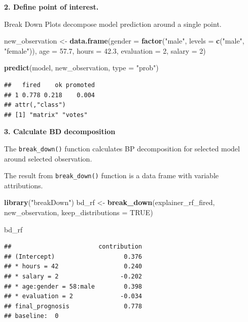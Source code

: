 \documentclass[]{book}
\newenvironment{Shaded}{\begin{snugshade}}{\end{snugshade}}
\newcommand{\DataTypeTok}[1]{\textcolor[rgb]{0.13,0.29,0.53}{#1}}
\newcommand{\DecValTok}[1]{\textcolor[rgb]{0.00,0.00,0.81}{#1}}
\newcommand{\FloatTok}[1]{\textcolor[rgb]{0.00,0.00,0.81}{#1}}
\newcommand{\KeywordTok}[1]{\textcolor[rgb]{0.13,0.29,0.53}{\textbf{#1}}}
\newcommand{\NormalTok}[1]{#1}
\newcommand{\OtherTok}[1]{\textcolor[rgb]{0.56,0.35,0.01}{#1}}
\newcommand{\StringTok}[1]{\textcolor[rgb]{0.31,0.60,0.02}{#1}}
\theoremstyle{definition}
\theoremstyle{definition}
\theoremstyle{definition}
\theoremstyle{remark}
\begin{document}
\textbf{2. Define point of interest.}

Break Down Plots decompose model prediction around a single point.

\begin{Shaded}
\begin{Highlighting}[]
\NormalTok{new_observation <-}\StringTok{ }\KeywordTok{data.frame}\NormalTok{(}\DataTypeTok{gender =} \KeywordTok{factor}\NormalTok{(}\StringTok{"male"}\NormalTok{, }\DataTypeTok{levels =} \KeywordTok{c}\NormalTok{(}\StringTok{"male"}\NormalTok{, }\StringTok{"female"}\NormalTok{)),}
                      \DataTypeTok{age =} \FloatTok{57.7}\NormalTok{,}
                      \DataTypeTok{hours =} \FloatTok{42.3}\NormalTok{,}
                      \DataTypeTok{evaluation =} \DecValTok{2}\NormalTok{,}
                      \DataTypeTok{salary =} \DecValTok{2}\NormalTok{)}

\KeywordTok{predict}\NormalTok{(model, new_observation, }\DataTypeTok{type =} \StringTok{"prob"}\NormalTok{)}
\end{Highlighting}
\end{Shaded}

\begin{verbatim}
##   fired    ok promoted
## 1 0.778 0.218    0.004
## attr(,"class")
## [1] "matrix" "votes"
\end{verbatim}

\textbf{3. Calculate BD decomposition}

The \texttt{break\_down()} function calculates BP decomposition for
selected model around selected observation.

The result from \texttt{break\_down()} function is a data frame with
variable attributions.

\begin{Shaded}
\begin{Highlighting}[]
\KeywordTok{library}\NormalTok{(}\StringTok{"breakDown"}\NormalTok{)}
\NormalTok{bd_rf <-}\StringTok{ }\KeywordTok{break_down}\NormalTok{(explainer_rf_fired,}
\NormalTok{                 new_observation,}
                 \DataTypeTok{keep_distributions =} \OtherTok{TRUE}\NormalTok{)}

\NormalTok{bd_rf}
\end{Highlighting}
\end{Shaded}

\begin{verbatim}
##                        contribution
## (Intercept)                   0.376
## * hours = 42                  0.240
## * salary = 2                 -0.202
## * age:gender = 58:male        0.398
## * evaluation = 2             -0.034
## final_prognosis               0.778
## baseline:  0
\end{verbatim}
\end{document}
